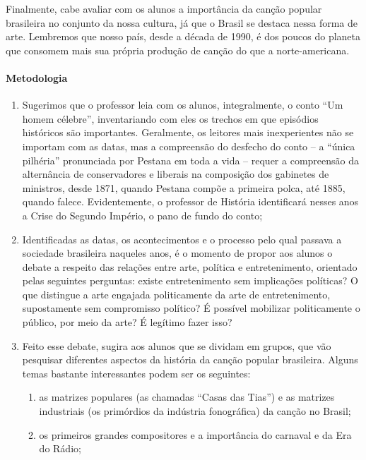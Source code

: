 \documentclass[11pt]{extarticle}
\begin{document}
Finalmente, cabe avaliar com os alunos a importância da canção popular
brasileira no conjunto da nossa cultura, já que o Brasil se destaca
nessa forma de arte. Lembremos que nosso país, desde a década de 1990, é
dos poucos do planeta que consomem mais sua própria produção de canção
do que a norte-americana.

\paragraph{Metodologia}

\begin{enumerate}
\item Sugerimos que o professor leia com os alunos, integralmente, o conto
``Um homem célebre'', inventariando com eles os trechos em que episódios
históricos são importantes. Geralmente, os leitores mais inexperientes
não se importam com as datas, mas a compreensão do desfecho do conto --
a ``única pilhéria'' pronunciada por Pestana em toda a vida -- requer a
compreensão da alternância de conservadores e liberais na composição dos
gabinetes de ministros, desde 1871, quando Pestana compõe a primeira
polca, até 1885, quando falece. Evidentemente, o professor de História
identificará nesses anos a Crise do Segundo Império, o pano de fundo do
conto;

\item Identificadas as datas, os acontecimentos e o processo pelo qual
passava a sociedade brasileira naqueles anos, é o momento de propor aos
alunos o debate a respeito das relações entre arte, política e
entretenimento, orientado pelas seguintes perguntas: existe
entretenimento sem implicações políticas? O que distingue a arte
engajada politicamente da arte de entretenimento, supostamente sem
compromisso político? É possível mobilizar politicamente o público, por
meio da arte? É legítimo fazer isso?

\item Feito esse debate, sugira aos alunos que se dividam em grupos, que
vão pesquisar diferentes aspectos da história da canção popular
brasileira. Alguns temas bastante interessantes podem ser os seguintes:

\begin{enumerate}
\item as matrizes populares (as chamadas ``Casas das Tias'') e as matrizes
industriais (os primórdios da indústria fonográfica) da canção no
Brasil;

\item os primeiros grandes compositores e a importância do carnaval e da
Era do Rádio;


\end{enumerate}
\end{enumerate}
\end{document}
